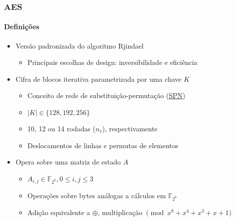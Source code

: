 \documentclass[12pt]{beamer}
\newcommand{\length}[1]{\vert #1 \vert}
\begin{document}
\begin{frame}
    \frametitle{AES}
    \framesubtitle{Definições}
    \begin{itemize}
        \item Versão padronizada do algoritmo Rjindael \cite{Daemen:2002:DR:560131}
        \begin{itemize}
            \item Principais escolhas de design: inversibilidade e eficiência
        \end{itemize}
        \item Cifra de blocos iterativa parametrizada por uma chave $K$
        \begin{itemize}
            \item Conceito de rede de substituição-permutação (\href{https://www.iacr.org/authors/tikz/tikz/Construction/spn.pdf}{SPN})
            \item $\length{K} \in \{128, 192, 256\}$
            \item 10, 12 ou 14 rodadas ($n_r$), respectivamente

            \item Deslocamentos de linhas e permutas de elementos
        \end{itemize}
        \item Opera sobre uma matriz de estado $A$
        \begin{itemize}
            \item $A_{i,j} \in \mathbb{F}_{2^8}, 0 \leq i, j \leq 3$
            \item Operações sobre bytes análogas a cálculos em $\mathbb{F}_{2^8}$
            \item Adição equivalente a $\oplus$, multiplicação $\pmod{x^8 + x^4 + x^3 + x + 1}$
        \end{itemize}
    \end{itemize}
\end{frame}
\end{document}
